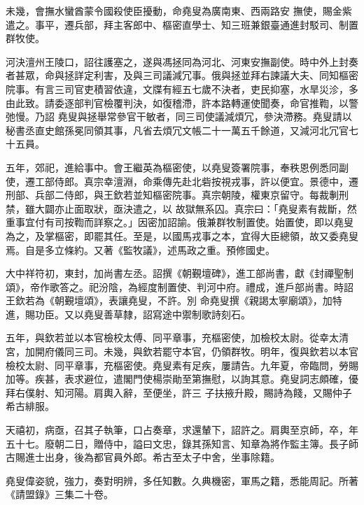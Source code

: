 \begin{pinyinscope}
 未幾，會撫水蠻酋蒙令國殺使臣擾動，命堯叟為廣南東、西兩路安
 撫使，賜金紫遣之。事平，遷兵部，拜主客郎中、樞密直學士、知三班兼銀臺通進封駁司、制置群牧使。



 河決澶州王陵口，詔往護塞之，遂與馮拯同為河北、河東安撫副使。時中外上封奏者甚眾，命與拯詳定利害，及與三司議減冗事。俄與拯並拜右諫議大夫、同知樞密院事。有言三司官吏積習依違，文牒有經五七歲不決者，吏民抑塞，水旱災沴，多由此致。請委逐部判官檢覆判決，如復稽滯，許本路轉運使聞奏，命官推鞫，以警弛慢。乃詔
 堯叟與拯舉常參官干敏者，同三司使議減煩冗，參決滯務。堯叟請以秘書丞直史館孫冕同領其事，凡省去煩冗文帳二十一萬五千餘道，又減河北冗官七十五員。



 五年，郊祀，進給事中。會王繼英為樞密使，以堯叟簽署院事，奉秩恩例悉同副使，遷工部侍郎。真宗幸澶淵，命乘傳先赴北砦按視戎事，許以便宜。景德中，遷刑部、兵部二侍郎，與王欽若並知樞密院事。真宗朝陵，權東京留守。每裁剸刑禁，雖大闢亦止面取狀，亟決遣之，以
 故獄無系囚。真宗曰：「堯叟素有裁斷，然重事宜付有司按鞫而詳察之。」因密加詔諭。俄兼群牧制置使。始置使，即以堯叟為之，及掌樞密，即罷其任。至是，以國馬戎事之本，宜得大臣總領，故又委堯叟焉。自是多立條約。又著《監牧議》，述馬政之重。預修國史。



 大中祥符初，東封，加尚書左丞。詔撰《朝覲壇碑》，進工部尚書，獻《封禪聖制頌》，帝作歌答之。祀汾陰，為經度制置使、判河中府。禮成，進戶部尚書。時詔王欽若為《朝覲壇頌》，表讓堯叟，不許。別
 命堯叟撰《親謁太寧廟頌》，加特進，賜功臣。又以堯叟善草隸，詔寫途中禦制歌詩刻石。



 五年，與欽若並以本官檢校太傅、同平章事，充樞密使，加檢校太尉。從幸太清宮，加開府儀同三司。未幾，與欽若罷守本官，仍領群牧。明年，復與欽若以本官檢校太尉、同平章事，充樞密使。堯叟素有足疾，屢請告。九年夏，帝臨問，勞賜加等。疾甚，表求避位，遣閣門使楊崇勛至第撫慰，以詢其意。堯叟詞志頗確，優拜右僕射、知河陽。肩輿入辭，至便坐，許三
 子扶掖升殿，賜詩為餞，又賜仲子希古緋服。



 天禧初，病亟，召其子執筆，口占奏章，求還輦下，詔許之。肩輿至京師，卒，年五十七。廢朝二日，贈侍中，謚曰文忠，錄其孫知言、知章為將作監主簿。長子師古賜進士出身，後為都官員外郎。希古至太子中舍，坐事除籍。



 堯叟偉姿貌，強力，奏對明辨，多任知數。久典機密，軍馬之籍，悉能周記。所著《請盟錄》三集二十卷。




\end{pinyinscope}
